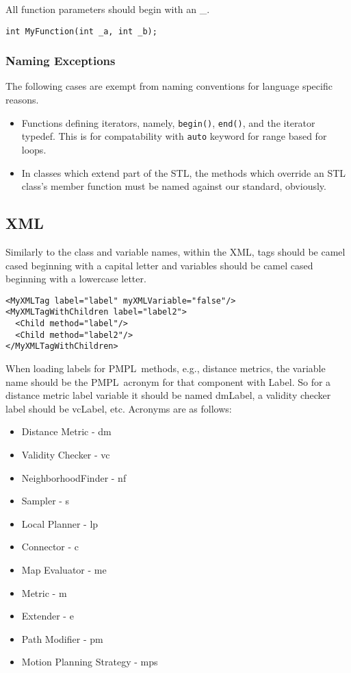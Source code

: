 \documentclass[12pt]{article}
\newcommand{\pmpl}{PMPL}
\begin{document}
All function parameters should begin with an \_.

\begin{lstlisting}
int MyFunction(int _a, int _b);
\end{lstlisting}

\subsubsection{Naming Exceptions}

The following cases are exempt from naming conventions for language specific
reasons.

\begin{itemize}

  \item Functions defining iterators, namely, \texttt{begin()}, \texttt{end()},
    and the iterator typedef. This is for compatability with \texttt{auto}
    keyword for range based for loops.

  \item In classes which extend part of the STL, the methods which override an
    STL class's member function must be named against our standard, obviously.

\end{itemize}

\subsection{XML}
Similarly to the class and variable names, within the XML, tags should be camel
cased beginning with a capital letter and variables should be camel cased
beginning with a lowercase letter.

\lstset{style=XML}
\begin{lstlisting}
<MyXMLTag label="label" myXMLVariable="false"/>
<MyXMLTagWithChildren label="label2">
  <Child method="label"/>
  <Child method="label2"/>
</MyXMLTagWithChildren>
\end{lstlisting}
\lstset{style=C++}

When loading labels for \pmpl\ methods, e.g., distance metrics, the variable
name should be the \pmpl\ acronym for that component with Label. So for a
distance metric label variable it should be named dmLabel, a validity checker
label should be vcLabel, etc. Acronyms are as follows:

\begin{itemize}
  \item Distance Metric - dm
  \item Validity Checker - vc
  \item NeighborhoodFinder - nf
  \item Sampler - s
  \item Local Planner - lp
  \item Connector - c
  \item Map Evaluator - me
  \item Metric - m
  \item Extender - e
  \item Path Modifier - pm
  \item Motion Planning Strategy - mps
\end{itemize}
\end{document}
